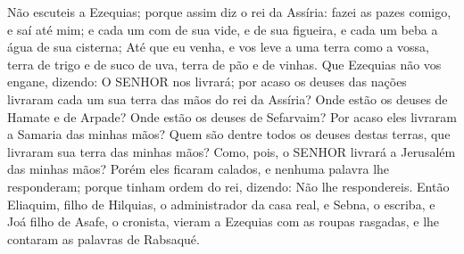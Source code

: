 {Não escuteis a Ezequias; porque assim diz o rei da Assíria: fazei as pazes comigo, e saí até mim; e cada um com de sua vide, e de sua figueira, e cada um beba a água de sua
{} cisterna;
Até que eu venha, e vos leve a uma terra como a vossa, terra de trigo e de suco de uva, terra de pão e de vinhas.
Que Ezequias não vos engane, dizendo: O SENHOR nos livrará; por acaso os deuses das nações livraram cada um sua terra das mãos do rei da Assíria?
Onde estão os deuses de Hamate e de Arpade? Onde estão os deuses de Sefarvaim? Por acaso eles livraram a Samaria das minhas mãos?
Quem são dentre todos os deuses destas terras, que livraram sua terra das minhas mãos? Como, pois, o SENHOR livrará a Jerusalém das minhas mãos?
Porém eles ficaram calados, e nenhuma palavra lhe responderam; porque tinham ordem do rei, dizendo: Não lhe respondereis.
Então Eliaquim, filho de Hilquias, o administrador da casa real, e Sebna, o escriba, e Joá filho de Asafe, o cronista, vieram a Ezequias com as roupas rasgadas, e lhe contaram as palavras de Rabsaqué.

}
